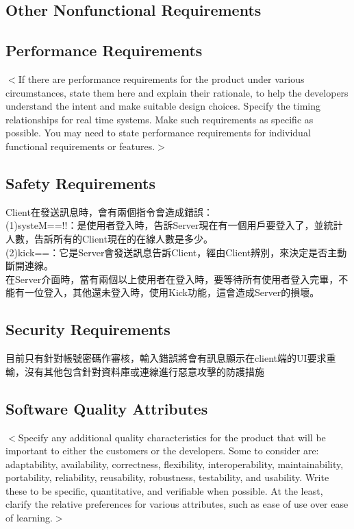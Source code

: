 \documentclass{scrreprt}
\begin{document}
\begin{CJK}{UTF8}{bkai}
\chapter{Other Nonfunctional Requirements}

\section{Performance Requirements}
$<$If there are performance requirements for the product under various 
circumstances, state them here and explain their rationale, to help the 
developers understand the intent and make suitable design choices. Specify the 
timing relationships for real time systems. Make such requirements as specific 
as possible. You may need to state performance requirements for individual 
functional requirements or features.$>$

\section{Safety Requirements}
Client在發送訊息時，會有兩個指令會造成錯誤：\\
(1)systeM==!!：是使用者登入時，告訴Server現在有一個用戶要登入了，並統計人數，告訴所有的Client現在的在線人數是多少。\\
(2)kick==：它是Server會發送訊息告訴Client，經由Client辨別，來決定是否主動斷開連線。\\
在Server介面時，當有兩個以上使用者在登入時，要等待所有使用者登入完畢，不能有一位登入，其他還未登入時，使用Kick功能，這會造成Server的損壞。\\


\section{Security Requirements}
目前只有針對帳號密碼作審核，輸入錯誤將會有訊息顯示在client端的UI要求重輸，沒有其他包含針對資料庫或連線進行惡意攻擊的防護措施

\section{Software Quality Attributes}
$<$Specify any additional quality characteristics for the product that will be 
important to either the customers or the developers. Some to consider are: 
adaptability, availability, correctness, flexibility, interoperability, 
maintainability, portability, reliability, reusability, robustness, testability, 
and usability. Write these to be specific, quantitative, and verifiable when 
possible. At the least, clarify the relative preferences for various attributes, 
such as ease of use over ease of learning.$>$


\end{CJK}
\end{document}
